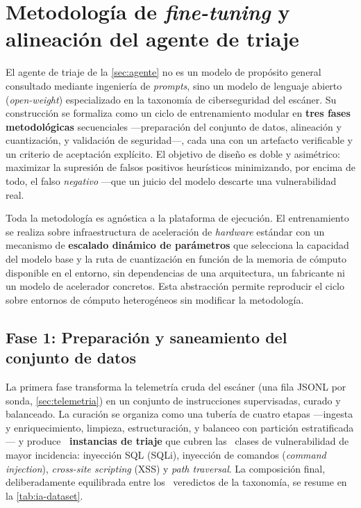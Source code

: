 
\section{Metodología de \emph{fine-tuning} y alineación del agente de triaje}
\label{sec:ia-metodologia}

El agente de triaje de la \cref{sec:agente} no es un modelo de propósito general
consultado mediante ingeniería de \emph{prompts}, sino un modelo de lenguaje
abierto (\emph{open-weight}) especializado en la taxonomía de ciberseguridad del
escáner. Su construcción se formaliza como un ciclo de entrenamiento modular en
\textbf{tres fases metodológicas} secuenciales ---preparación del conjunto de
datos, alineación y cuantización, y validación de seguridad---, cada una con un
artefacto verificable y un criterio de aceptación explícito. El objetivo de
diseño es doble y asimétrico: maximizar la supresión de falsos positivos
heurísticos minimizando, por encima de todo, el falso \emph{negativo} ---que un
juicio del modelo descarte una vulnerabilidad real.

Toda la metodología es agnóstica a la plataforma de ejecución. El
entrenamiento se realiza sobre infraestructura de aceleración de \emph{hardware}
estándar con un mecanismo de \textbf{escalado dinámico de parámetros} que
selecciona la capacidad del modelo base y la ruta de cuantización en función de
la memoria de cómputo disponible en el entorno, sin dependencias de una
arquitectura, un fabricante ni un modelo de acelerador concretos. Esta
abstracción permite reproducir el ciclo sobre entornos de cómputo heterogéneos
sin modificar la metodología.

\subsection{Fase 1: Preparación y saneamiento del conjunto de datos}
\label{sec:ia-dataset}

La primera fase transforma la telemetría cruda del escáner (una fila JSONL por
sonda, \cref{sec:telemetria}) en un conjunto de instrucciones supervisadas,
curado y balanceado. La curación se organiza como una tubería de cuatro etapas
---ingesta y enriquecimiento, limpieza, estructuración, y balanceo con partición
estratificada--- y produce \textbf{\IADatasetTriaje{}~instancias de triaje} que
cubren las \IAClasesTaxonomia{}~clases de vulnerabilidad de mayor incidencia:
inyección SQL (SQLi), inyección de comandos (\emph{command injection}),
\emph{cross-site scripting} (XSS) y \emph{path traversal}. La composición
final, deliberadamente equilibrada entre los \IAVeredictos{}~veredictos de la
taxonomía, se resume en la \cref{tab:ia-dataset}.

